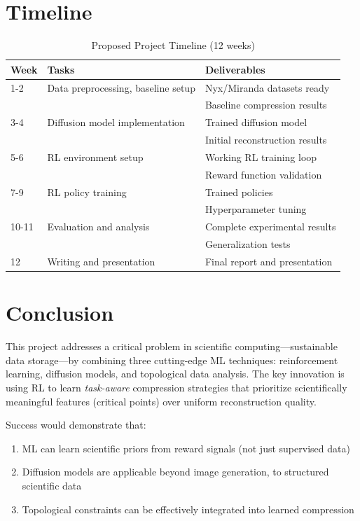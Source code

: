 \documentclass[11pt]{article}
\begin{document}
\section{Timeline}

\begin{table}[h]
\centering
\caption{Proposed Project Timeline (12 weeks)}
\begin{tabular}{@{}lll@{}}
\toprule
\textbf{Week} & \textbf{Tasks} & \textbf{Deliverables} \\ \midrule
1-2 & Data preprocessing, baseline setup & Nyx/Miranda datasets ready \\
& & Baseline compression results \\ \midrule
3-4 & Diffusion model implementation & Trained diffusion model \\
& & Initial reconstruction results \\ \midrule
5-6 & RL environment setup & Working RL training loop \\
& & Reward function validation \\ \midrule
7-9 & RL policy training & Trained policies \\
& & Hyperparameter tuning \\ \midrule
10-11 & Evaluation and analysis & Complete experimental results \\
& & Generalization tests \\ \midrule
12 & Writing and presentation & Final report and presentation \\ \bottomrule
\end{tabular}
\end{table}

\section{Conclusion}

This project addresses a critical problem in scientific computing—sustainable data storage—by combining three cutting-edge ML techniques: reinforcement learning, diffusion models, and topological data analysis. The key innovation is using RL to learn \textit{task-aware} compression strategies that prioritize scientifically meaningful features (critical points) over uniform reconstruction quality.

Success would demonstrate that:
\begin{enumerate}
    \item ML can learn scientific priors from reward signals (not just supervised data)
    \item Diffusion models are applicable beyond image generation, to structured scientific data
    \item Topological constraints can be effectively integrated into learned compression
\end{enumerate}
\end{document}
